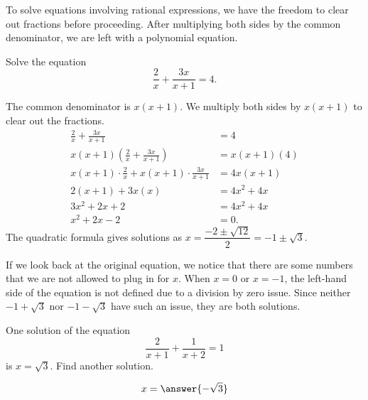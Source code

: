 \documentclass{ximera}
\begin{document}
To solve equations involving rational expressions, we have the freedom to clear out fractions before proceeding.
After multiplying both sides by the common denominator, we are left with a polynomial equation.
\begin{example}
	Solve the equation
	\[  \frac{2}{x} + \frac{3x}{x+1} = 4.\]
	\begin{explanation}
		The common denominator is $x(x+1)$.  We multiply both sides by $x(x+1)$ to clear out the fractions.
		\begin{align*}
			\frac{2}{x} + \frac{3x}{x+1} &= 4	\\
			x(x+1) \left( \frac{2}{x} + \frac{3x}{x+1} \right) &= x(x+1) ( 4 )\\
			x(x+1) \cdot \frac{2}{x}  + x(x+1) \cdot \frac{3x}{x+1} &= 4x(x+1)\\
			2(x+1) + 3x(x) &= 4x^2 + 4x\\
			3x^2 + 2x + 2 &= 4x^2 + 4x\\
			x^2 + 2x - 2 &= 0.
		\end{align*}
		The quadratic formula gives solutions as $\displaystyle x = \dfrac{-2 \pm \sqrt{12}}{2} = -1 \pm \sqrt{3}$.
		
		If we look back at the original equation, we notice that there are some numbers that we are not allowed to plug in for $x$.  When $x=0$ or $x=-1$,
		the left-hand side of the equation is not defined due to a division by zero issue.  Since neither $-1 + \sqrt{3}$ nor $-1-\sqrt{3}$ have such an issue,
		they are both solutions.
	\end{explanation}
\end{example}

\begin{question}
	One solution of the equation \[ \dfrac{2}{x+1}+ \dfrac{1}{x+2} = 1 \] is $x = \sqrt{3}$.  Find another solution. 
	\begin{prompt}
		\[ x = \answer{-\sqrt{3}} \]
	\end{prompt}
\end{question}
\end{document}
